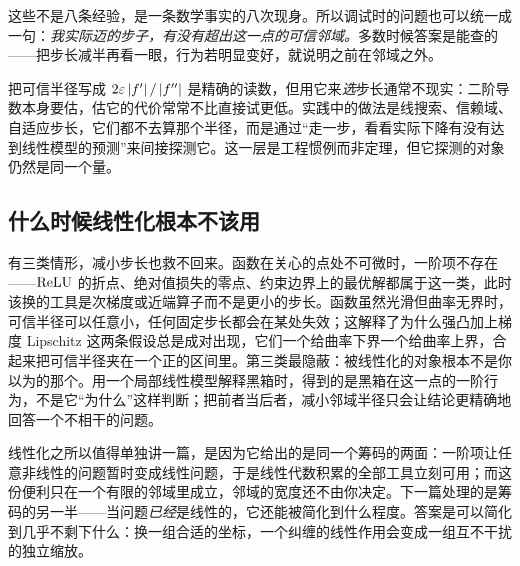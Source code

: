 这些不是八条经验，是一条数学事实的八次现身。所以调试时的问题也可以统一成一句：\emph{我实际迈的步子，有没有超出这一点的可信邻域。}多数时候答案是能查的——把步长减半再看一眼，行为若明显变好，就说明之前在邻域之外。

\begin{remark}
把可信半径写成 \(2\varepsilon\left|f'\right|/\left|f''\right|\) 是精确的读数，但用它来\emph{选}步长通常不现实：二阶导数本身要估，估它的代价常常不比直接试更低。实践中的做法是线搜索、信赖域、自适应步长，它们都不去算那个半径，而是通过``走一步，看看实际下降有没有达到线性模型的预测''来间接探测它。这一层是工程惯例而非定理，但它探测的对象仍然是同一个量。
\end{remark}

\subsection{什么时候线性化根本不该用}

有三类情形，减小步长也救不回来。函数在关心的点处不可微时，一阶项不存在——\(\operatorname{ReLU}\) 的折点、绝对值损失的零点、约束边界上的最优解都属于这一类，此时该换的工具是次梯度或近端算子而不是更小的步长。函数虽然光滑但曲率无界时，可信半径可以任意小，任何固定步长都会在某处失效；这解释了为什么强凸加上梯度 Lipschitz 这两条假设总是成对出现，它们一个给曲率下界一个给曲率上界，合起来把可信半径夹在一个正的区间里。第三类最隐蔽：被线性化的对象根本不是你以为的那个。用一个局部线性模型解释黑箱时，得到的是黑箱在这一点的一阶行为，不是它``为什么''这样判断；把前者当后者，减小邻域半径只会让结论更精确地回答一个不相干的问题。

线性化之所以值得单独讲一篇，是因为它给出的是同一个筹码的两面：一阶项让任意非线性的问题暂时变成线性问题，于是线性代数积累的全部工具立刻可用；而这份便利只在一个有限的邻域里成立，邻域的宽度还不由你决定。下一篇处理的是筹码的另一半——当问题\emph{已经}是线性的，它还能被简化到什么程度。答案是可以简化到几乎不剩下什么：换一组合适的坐标，一个纠缠的线性作用会变成一组互不干扰的独立缩放。
